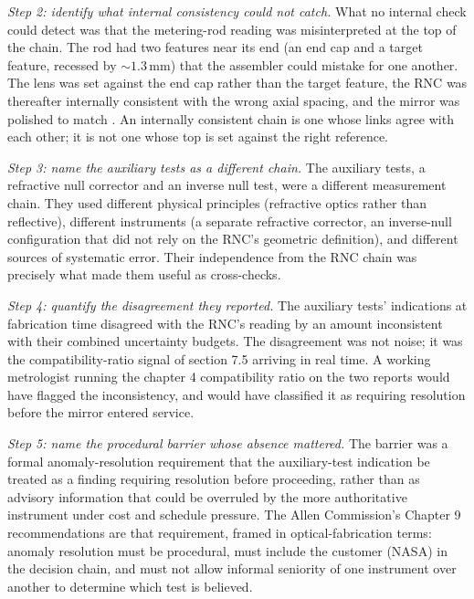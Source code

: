 \emph{Step 2: identify what internal consistency could not catch.}
What no internal check could detect was that the metering-rod
reading was misinterpreted at the top of the chain. The rod had
two features near its end (an end cap and a target feature,
recessed by $\sim 1.3 \,\si{\milli\meter}$) that the assembler
could mistake for one another. The lens was set against the end
cap rather than the target feature, the RNC was thereafter
internally consistent with the wrong axial spacing, and the mirror
was polished to match
\cite{acc:nasa-hubble-optical-systems-1990}. An internally
consistent chain is one whose links agree with each other; it is
not one whose top is set against the right reference.

\emph{Step 3: name the auxiliary tests as a different chain.}
The auxiliary tests, a refractive null corrector and an inverse
null test, were a different measurement chain. They used different
physical principles (refractive optics rather than reflective),
different instruments (a separate refractive corrector, an
inverse-null configuration that did not rely on the RNC's
geometric definition), and different sources of systematic error.
Their independence from the RNC chain was precisely what made them
useful as cross-checks.

\emph{Step 4: quantify the disagreement they reported.}
The auxiliary tests' indications at fabrication time disagreed
with the RNC's reading by an amount inconsistent with their
combined uncertainty budgets. The disagreement was not noise; it
was the compatibility-ratio signal of section 7.5 arriving in
real time. A working metrologist running the chapter 4
compatibility ratio on the two reports would have flagged the
inconsistency, and would have classified it as requiring
resolution before the mirror entered service.

\emph{Step 5: name the procedural barrier whose absence
mattered.}
The barrier was a formal anomaly-resolution requirement that the
auxiliary-test indication be treated as a finding requiring
resolution before proceeding, rather than as advisory information
that could be overruled by the more authoritative instrument under
cost and schedule pressure. The Allen Commission's Chapter 9
recommendations \cite{acc:nasa-hubble-optical-systems-1990} are
that requirement, framed in optical-fabrication terms: anomaly
resolution must be procedural, must include the customer (NASA)
in the decision chain, and must not allow informal seniority of
one instrument over another to determine which test is believed.

